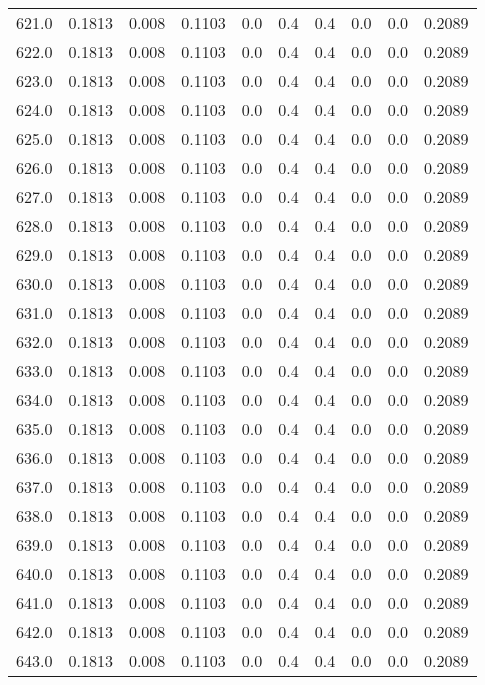 \begin{longtable}{lrrrrrrrrr}
621.0 & 0.1813 & 0.008 & 0.1103 & 0.0 & 0.4 & 0.4 & 0.0 & 0.0 & 0.2089 \\
622.0 & 0.1813 & 0.008 & 0.1103 & 0.0 & 0.4 & 0.4 & 0.0 & 0.0 & 0.2089 \\
623.0 & 0.1813 & 0.008 & 0.1103 & 0.0 & 0.4 & 0.4 & 0.0 & 0.0 & 0.2089 \\
624.0 & 0.1813 & 0.008 & 0.1103 & 0.0 & 0.4 & 0.4 & 0.0 & 0.0 & 0.2089 \\
625.0 & 0.1813 & 0.008 & 0.1103 & 0.0 & 0.4 & 0.4 & 0.0 & 0.0 & 0.2089 \\
626.0 & 0.1813 & 0.008 & 0.1103 & 0.0 & 0.4 & 0.4 & 0.0 & 0.0 & 0.2089 \\
627.0 & 0.1813 & 0.008 & 0.1103 & 0.0 & 0.4 & 0.4 & 0.0 & 0.0 & 0.2089 \\
628.0 & 0.1813 & 0.008 & 0.1103 & 0.0 & 0.4 & 0.4 & 0.0 & 0.0 & 0.2089 \\
629.0 & 0.1813 & 0.008 & 0.1103 & 0.0 & 0.4 & 0.4 & 0.0 & 0.0 & 0.2089 \\
630.0 & 0.1813 & 0.008 & 0.1103 & 0.0 & 0.4 & 0.4 & 0.0 & 0.0 & 0.2089 \\
631.0 & 0.1813 & 0.008 & 0.1103 & 0.0 & 0.4 & 0.4 & 0.0 & 0.0 & 0.2089 \\
632.0 & 0.1813 & 0.008 & 0.1103 & 0.0 & 0.4 & 0.4 & 0.0 & 0.0 & 0.2089 \\
633.0 & 0.1813 & 0.008 & 0.1103 & 0.0 & 0.4 & 0.4 & 0.0 & 0.0 & 0.2089 \\
634.0 & 0.1813 & 0.008 & 0.1103 & 0.0 & 0.4 & 0.4 & 0.0 & 0.0 & 0.2089 \\
635.0 & 0.1813 & 0.008 & 0.1103 & 0.0 & 0.4 & 0.4 & 0.0 & 0.0 & 0.2089 \\
636.0 & 0.1813 & 0.008 & 0.1103 & 0.0 & 0.4 & 0.4 & 0.0 & 0.0 & 0.2089 \\
637.0 & 0.1813 & 0.008 & 0.1103 & 0.0 & 0.4 & 0.4 & 0.0 & 0.0 & 0.2089 \\
638.0 & 0.1813 & 0.008 & 0.1103 & 0.0 & 0.4 & 0.4 & 0.0 & 0.0 & 0.2089 \\
639.0 & 0.1813 & 0.008 & 0.1103 & 0.0 & 0.4 & 0.4 & 0.0 & 0.0 & 0.2089 \\
640.0 & 0.1813 & 0.008 & 0.1103 & 0.0 & 0.4 & 0.4 & 0.0 & 0.0 & 0.2089 \\
641.0 & 0.1813 & 0.008 & 0.1103 & 0.0 & 0.4 & 0.4 & 0.0 & 0.0 & 0.2089 \\
642.0 & 0.1813 & 0.008 & 0.1103 & 0.0 & 0.4 & 0.4 & 0.0 & 0.0 & 0.2089 \\
643.0 & 0.1813 & 0.008 & 0.1103 & 0.0 & 0.4 & 0.4 & 0.0 & 0.0 & 0.2089 \\

\end{longtable}

